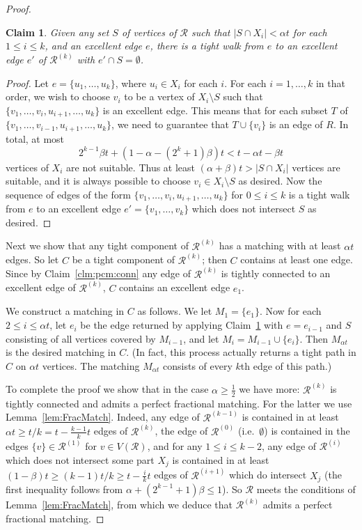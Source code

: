 \documentclass[12pt,a4paper]{amsart}
\newtheorem{claim}[theorem] {Claim}
\newcommand{\oldqed}{}
\def\endofClaim{\hfill\scalebox{.6}{$\Box$}}
\newenvironment{claimproof}[1][Proof]{
  \renewcommand{\oldqed}{\qedsymbol}
  \renewcommand{\qedsymbol}{\endofClaim}
  \begin{proof}[#1]
}{
  \end{proof}
  \renewcommand{\qedsymbol}{\oldqed}
}
\newcommand{\cR}{\mathcal{R}}
\begin{document}
\begin{proof}
\begin{claim}\label{clm:getedge}
 Given any set $S$ of vertices of $\cR$ such that $|S\cap X_i|<\alpha t$ for each
 $1\le i\le k$, and an excellent edge $e$, there is a tight walk from $e$ to an excellent edge $e'$ of $\cR^{(k)}$ with $e'\cap S=\emptyset$. 
\end{claim}
\begin{claimproof}
Let $e = \{u_1, \dots, u_k\}$, where $u_i \in X_i$ for each $i$.
 For each $i=1,\ldots,k$ in that order, we wish to choose $v_i$ to be a vertex of
 $X_i\setminus S$ such that $\{v_1,\ldots,v_i,u_{i+1},\ldots,u_k\}$ is an
 excellent edge. This means that for each subset $T$ of
 $\{v_1,\ldots,v_{i-1},u_{i+1},\ldots,u_k\}$, we need to guarantee that
 $T\cup\{v_i\}$ is an edge of $R$. 
In total, at most
\[2^{k-1}\beta t+(1-\alpha-(2^k+1)\beta)t < t-\alpha t-\beta t\]
  vertices of $X_i$ are not suitable. Thus at least $(\alpha+\beta)t>|S \cap X_i|$
vertices are suitable, and it is always possible to choose $v_i\in X_i\setminus
S$ as desired. Now the sequence of edges of the form $\{v_1,\ldots,v_i,u_{i+1},\ldots,u_k\}$
for $0\le i\le k$ is a tight walk from $e$ to an excellent edge $e'=\{v_1,\ldots,v_k\}$ which does not intersect
$S$ as desired.
\end{claimproof}

Next we show that any tight component of $\cR^{(k)}$ has a matching with at
least $\alpha t$ edges. So let $C$ be a tight component of $\cR^{(k)}$; then $C$ contains at least one edge. Since by Claim~\ref{clm:pcm:conn} any
edge of $\cR^{(k)}$ is tightly connected to an excellent edge of $\cR^{(k)}$, $C$ contains an excellent edge
$e_1$.

We construct a matching in $C$ as follows. We let $M_1=\{e_1\}$. Now for each
$2\le i\le \alpha t$, let $e_i$ be the edge returned by applying
Claim~\ref{clm:getedge} with $e = e_{i-1}$ and $S$ consisting of all vertices covered by
$M_{i-1}$, and let $M_i=M_{i-1}\cup\{e_i\}$. Then $M_{\alpha t}$ is the
desired matching in $C$. (In fact, this process actually returns a tight path in $C$ on $\alpha t$ vertices. The matching $M_{\alpha t}$ consists of every $k$th edge of this path.)

To complete the proof we show that in the case $\alpha\ge\frac{1}{2}$ we have more: $\cR^{(k)}$ is tightly connected and admits a perfect fractional matching. For the latter we use Lemma~\ref{lem:FracMatch}. Indeed, any edge of $\cR^{(k-1)}$ is contained in at least $\alpha t \geq t/k=t-\tfrac{k-1}{k}t$ edges of $\cR^{(k)}$, the edge of $\cR^{(0)}$ (i.e.~$\emptyset$) is contained in the edges $\{v\} \in \cR^{(1)}$ for $v \in V(\cR)$, and for any $1 \leq i \leq k-2$, any edge of $\cR^{(i)}$ which does not intersect some part $X_j$ is contained in at least $(1-\beta)t \geq (k-1)t/k\ge t-\tfrac{i}{k}t$ edges of $\cR^{(i+1)}$ which do intersect $X_j$ (the first inequality follows from $\alpha + (2^{k-1}+1)\beta \le 1$). So $\cR$ meets the conditions of Lemma~\ref{lem:FracMatch}, from which we deduce that $\cR^{(k)}$ admits a perfect fractional matching.


\end{proof}
\end{document}
